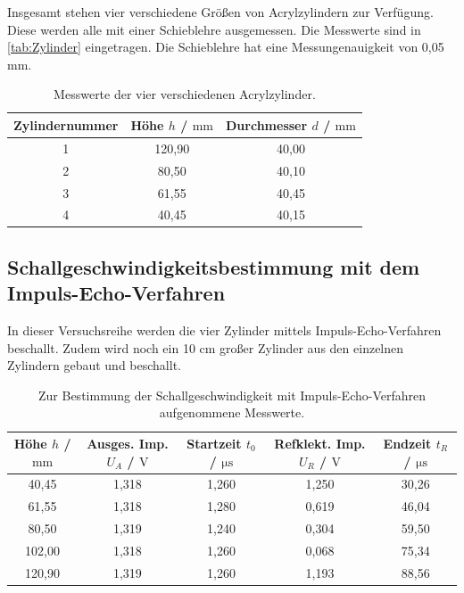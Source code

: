   Insgesamt stehen vier verschiedene Größen von Acrylzylindern zur Verfügung. Diese werden alle mit einer Schieblehre
  ausgemessen. Die Messwerte sind in \autoref{tab:Zylinder} eingetragen. Die Schieblehre hat eine Messungenauigkeit von
  0,05 mm.

  \begin{table}
    \centering
    \caption{Messwerte der vier verschiedenen Acrylzylinder.}
    \label{tab:Zylinder}
    \begin{tabular}{c | c c}
      Zylindernummer & Höhe $h$ / $\si{\milli\meter}$ & Durchmesser $d$ / $\si{\milli\meter}$ \\
        \midrule
          1 & 120,90 & 40,00 \\
          2 & 80,50  & 40,10 \\
          3 & 61,55  & 40,45 \\
          4 & 40,45  & 40,15 \\
        \bottomrule
      \end{tabular}
  \end{table}

\subsection{Schallgeschwindigkeitsbestimmung mit dem Impuls-Echo-Verfahren}

  In dieser Versuchsreihe werden die vier Zylinder mittels Impuls-Echo-Verfahren beschallt. Zudem wird noch
  ein 10 cm großer Zylinder aus den einzelnen Zylindern gebaut und beschallt.

  \begin{table}
    \centering
    \caption{Zur Bestimmung der Schallgeschwindigkeit mit Impuls-Echo-Verfahren aufgenommene Messwerte.}
    \label{tab:EchoImpuls}
    \begin{tabular}{c | c c c c}
      Höhe $h$ / $\si{\milli\meter}$ & Ausges. Imp. $U_A$ / $\si{\volt}$ &  Startzeit $t_0$ / $\si{\micro\second}$ & Refklekt. Imp. $U_R$ / $\si{\volt}$ & Endzeit $t_R$ / $\si{\micro\second}$ \\
        \midrule
          40,45 & 1,318 & 1,260 & 1,250 & 30,26 \\
          61,55 & 1,318 & 1,280 & 0,619 & 46,04 \\
          80,50 & 1,319 & 1,240 & 0,304 & 59,50 \\
          102,00 & 1,318 & 1,260 & 0,068 & 75,34 \\
          120,90 & 1,319 & 1,260 & 1,193 & 88,56 \\
        \bottomrule
      \end{tabular}
  \end{table}


